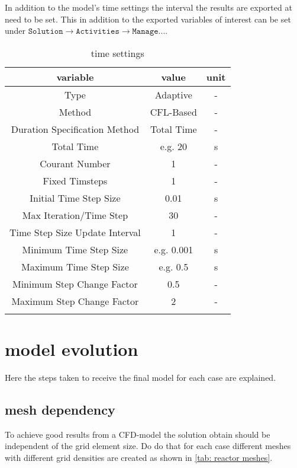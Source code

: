 \documentclass[../thesis.tex]{subfiles}
\begin{document}
In addition to the model's time settings the interval the results are exported at need to be set. This in addition to the exported variables of interest can be set under $\texttt{Solution} \rightarrow \texttt{Activities} \rightarrow \texttt{Manage...}$.

\begin{table} [htb]
	\centering
	\caption{time settings}
	\begin{tabular}{ ccc }
		\hline
		variable & value & unit \\
		\hline
		Type & Adaptive & - \\
		Method & CFL-Based & - \\
		Duration Specification Method & Total Time & -\\
		Total Time & e.g. 20 & s \\
		Courant Number & 1 & - \\
		Fixed Timsteps & 1 & - \\
		Initial Time Step Size & 0.01 & s \\
		Max Iteration/Time Step & 30 & - \\
		Time Step Size Update Interval & 1 & - \\
		Minimum Time Step Size & e.g. 0.001 & s \\
		Maximum Time Step Size & e.g. 0.5 & s \\
		Minimum Step Change Factor & 0.5 & - \\
		Maximum Step Change Factor & 2 & - \\		
		\hline
		\label{tab:ansys_setup_time}
	\end{tabular}
\end{table}

\section{model evolution}
\label{sec: mod_evol}

Here the steps taken to receive the final model for each case are explained.

\subsection{mesh dependency}

To achieve good results from a CFD-model the solution obtain should be independent of the grid element size. 
Do do that for each case different meshes with different grid densities are created as shown in \autoref{tab: reactor meshes}.
\end{document}
